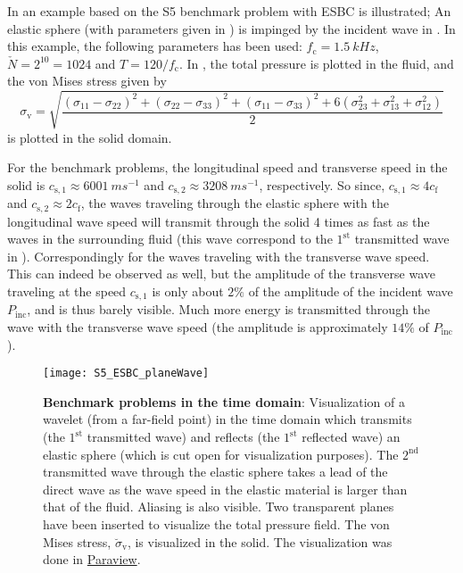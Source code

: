 In  an example based on the S5 benchmark problem with ESBC is illustrated; An elastic sphere (with parameters given in ) is impinged by the incident wave in . In this example, the following parameters has been used: $f_{\mathrm{c}}=\SI{1.5}{kHz}$, $\check{N}=2^{10}=1024$ and $T=120/f_{\mathrm{c}}$. In , the total pressure is plotted in the fluid, and the von Mises stress given by
\begin{equation}
	\sigma_{\mathrm{v}} =  \sqrt{\frac{(\sigma_{11} - \sigma_{22})^2 + (\sigma_{22} - \sigma_{33})^2 + (\sigma_{11} - \sigma_{33})^2 + 6(\sigma_{23}^2 + \sigma_{13}^2 + \sigma_{12}^2)}{2}} 
\end{equation}
is plotted in the solid domain.

For the benchmark problems, the longitudinal speed and transverse speed in the solid is $c_{\mathrm{s},1}\approx \SI{6001}{ms^{-1}}$ and $c_{\mathrm{s},2}\approx \SI{3208}{ms^{-1}}$, respectively. So since, $c_{\mathrm{s},1}\approx 4c_{\mathrm{f}}$ and $c_{\mathrm{s},2}\approx 2c_{\mathrm{f}}$, the waves traveling through the elastic sphere with the longitudinal wave speed will transmit through the solid 4 times as fast as the waves in the surrounding fluid (this wave correspond to the $1^{\mathrm{st}}$ transmitted wave in ). Correspondingly for the waves traveling with the transverse wave speed. This can indeed be observed as well, but the amplitude of the transverse wave traveling at the speed $c_{\mathrm{s},1}$ is only about $2\%$ of the amplitude of the incident wave $P_{\mathrm{inc}}$, and is thus barely visible. Much more energy is transmitted through the wave with the transverse wave speed (the amplitude is approximately $14\%$ of $P_{\mathrm{inc}}$).
\begin{figure}
	\centering
	\texttt{[image: S5\_ESBC\_planeWave]}
    \caption{\textbf{Benchmark problems in the time domain}: Visualization of a wavelet (from a far-field point) in the time domain which transmits (the $1^{\mathrm{st}}$ transmitted wave) and reflects (the $1^{\mathrm{st}}$ reflected wave) an elastic sphere (which is cut open for visualization purposes). The $2^{\mathrm{nd}}$ transmitted wave through the elastic sphere takes a lead of the direct wave as the wave speed in the elastic material is larger than that of the fluid. Aliasing is also visible. Two transparent planes have been inserted to visualize the total pressure field. The von Mises stress, $\breve{\sigma}_{\mathrm{v}}$, is visualized in the solid. The visualization was done in \href{http://www.paraview.org/}{Paraview}.}
	\label{Fig1:S5_ESBC_planeWave}
\end{figure}

